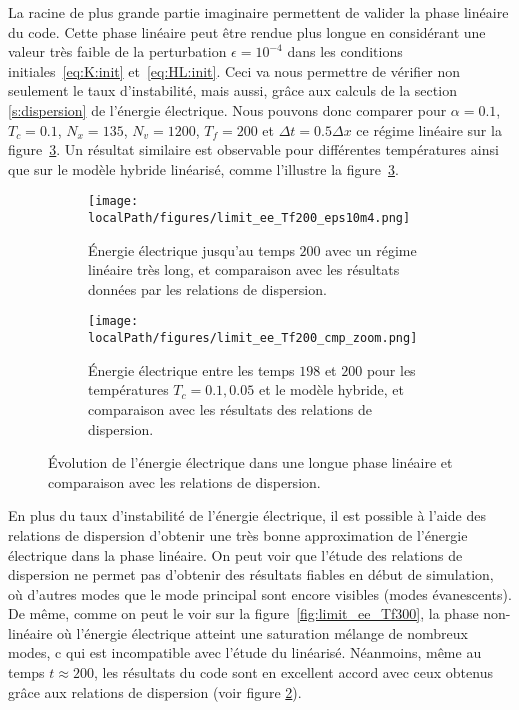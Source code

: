 La racine de plus grande partie imaginaire permettent de valider la phase lin\'eaire du code. Cette phase lin\'eaire peut \^etre rendue plus 
longue en consid\'erant une valeur très faible de la perturbation $\epsilon=10^{-4}$ dans les conditions initiales~\eqref{eq:K:init} et~\eqref{eq:HL:init}. Ceci va nous permettre de v\'erifier non seulement le taux d'instabilit\'e, mais aussi, gr\^ace aux calculs de la section \ref{s:dispersion} de l'\'energie \'electrique. Nous pouvons donc comparer pour $\alpha = 0.1$, $T_c=0.1$, $N_x=135$, $N_v=1200$, $T_f=200$ et $\Delta t = 0.5\Delta x$ ce régime linéaire sur la figure~\ref{fig:limit:ee:Tf200}. Un résultat similaire est observable pour différentes températures ainsi que sur le modèle hybride linéarisé, comme l'illustre la figure~\ref{fig:limit:ee:Tf200}. 
\begin{figure}
  \centering
  \begin{subfigure}{0.8\textwidth}
    \centering
    \texttt{[image: \\localPath/figures/limit\_ee\_Tf200\_eps10m4.png]}
    \caption{Énergie électrique jusqu'au temps $200$ avec un régime linéaire très long, et comparaison avec les résultats données par les relations de dispersion.}
    \label{fig:limit:ee:Tf200:eps10m4}
  \end{subfigure}
  \begin{subfigure}{0.8\textwidth}
    \centering
    \texttt{[image: \\localPath/figures/limit\_ee\_Tf200\_cmp\_zoom.png]}
    \caption{Énergie électrique entre les temps $198$ et $200$ pour les températures $T_c = 0.1,0.05$ et le modèle hybride, et comparaison avec les résultats des relations de dispersion.}
    \label{fig:limit:ee:Tf200:cmp_zoom}
  \end{subfigure}
  \caption{Évolution de l'énergie électrique dans une longue phase linéaire et comparaison avec les relations de dispersion.}
  \label{fig:limit:ee:Tf200}
\end{figure}
En plus du taux d'instabilité de l'énergie électrique, il est possible à l'aide des relations de dispersion d'obtenir une très bonne approximation de l'énergie électrique dans la phase linéaire. On peut voir que l'\'etude des relations de dispersion 
ne permet pas d'obtenir des résultats fiables en début de simulation, où d'autres modes que le mode principal sont encore visibles (modes \'evanescents). De m\^eme, comme on peut le voir sur la figure~\ref{fig:limit_ee_Tf300}, la phase non-linéaire où l'énergie électrique atteint une saturation m\'elange de nombreux modes, c qui est incompatible avec l'\'etude du lin\'earis\'e. N\'eanmoins, m\^eme au temps $t\approx 200$, 
les r\'esultats du code sont en excellent accord avec ceux obtenus gr\^ace aux relations de dispersion  (voir figure \ref{fig:limit:ee:Tf200:cmp_zoom}). 


